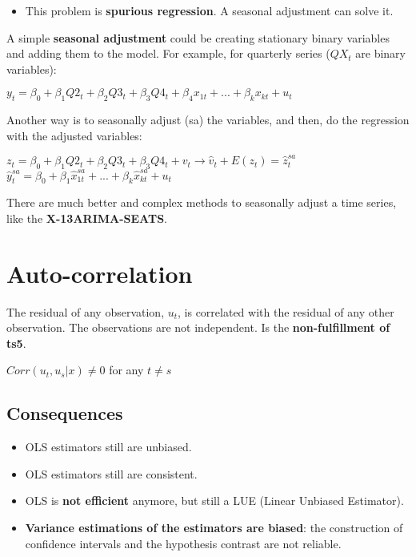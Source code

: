 \documentclass[10pt, a4paper, landscape]{extarticle}
\begin{document}
\begin{multicols}{3}
\begin{multicols}{2}
		\end{multicols}
		\begin{itemize}[leftmargin=*]
			\item This problem is \textbf{spurious regression}. A seasonal adjustment can solve it.
		\end{itemize}
		A simple \textbf{seasonal adjustment} could be creating stationary binary variables and adding them to the model. For example, for quarterly series ($QX_t$ are binary variables):
		\begin{center}
			$y_t = \beta_0 + \beta_1 Q2_t + \beta_2 Q3_t + \beta_3 Q4_t + \beta_4 x_{1t} + ... + \beta_k x_{kt} + u_t$
		\end{center}
		Another way is to seasonally adjust (sa) the variables, and then, do the regression with the adjusted variables:
		\begin{center}
			$z_t = \beta_0 + \beta_1 Q2_t + \beta_2 Q3_t + \beta_3 Q4_t  + v_t \rightarrow \hat{v}_t + E(z_t) = \hat{z}_t^{sa}$
			$\hat{y}_t^{sa} = \beta_0 + \beta_1 \hat{x}_{1t}^{sa} + ... + \beta_k \hat{x}_{kt}^{sa} + u_t$
		\end{center}
		There are much better and complex methods to seasonally adjust a time series, like the \textbf{X-13ARIMA-SEATS}.
\columnbreak
\section*{Auto-correlation}
	The residual of any observation, $u_t$, is correlated with the residual of any other observation. The observations are not independent. Is the \textbf{non-fulfillment of ts5}.
	\begin{center}
		$Corr(u_t, u_s | x) \neq 0$ for any $t \neq s$
	\end{center}
	\subsection*{Consequences}
		\begin{itemize}[leftmargin=*]
			\item OLS estimators still are unbiased.
			\item OLS estimators still are consistent.
			\item OLS is \textbf{not efficient} anymore, but still a LUE (Linear Unbiased Estimator).
			\item \textbf{Variance estimations of the estimators are biased}: the construction of confidence intervals and the hypothesis contrast are not reliable.
		\end{itemize}

\end{multicols}
\end{document}
